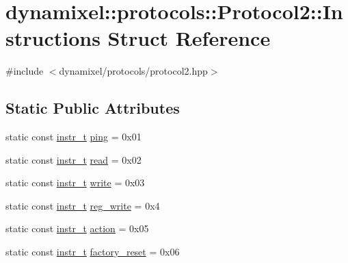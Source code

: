 \hypertarget{structdynamixel_1_1protocols_1_1_protocol2_1_1_instructions}{}\section{dynamixel\+:\+:protocols\+:\+:Protocol2\+:\+:Instructions Struct Reference}
\label{structdynamixel_1_1protocols_1_1_protocol2_1_1_instructions}


{\ttfamily \#include $<$dynamixel/protocols/protocol2.\+hpp$>$}

\subsection*{Static Public Attributes}
\begin{DoxyCompactItemize}
\item 
static const \hyperlink{classdynamixel_1_1protocols_1_1_protocol2_aa7302f20356607bd51e4d4ecf4cb7abf}{instr\+\_\+t} \hyperlink{structdynamixel_1_1protocols_1_1_protocol2_1_1_instructions_ad29aca8a7ac1a0d209c93cf67f1fe0c8}{ping} = 0x01
\item 
static const \hyperlink{classdynamixel_1_1protocols_1_1_protocol2_aa7302f20356607bd51e4d4ecf4cb7abf}{instr\+\_\+t} \hyperlink{structdynamixel_1_1protocols_1_1_protocol2_1_1_instructions_a3d42d5d1d77179010ffc6c02efbffdc7}{read} = 0x02
\item 
static const \hyperlink{classdynamixel_1_1protocols_1_1_protocol2_aa7302f20356607bd51e4d4ecf4cb7abf}{instr\+\_\+t} \hyperlink{structdynamixel_1_1protocols_1_1_protocol2_1_1_instructions_a8962296bdcb1cc06e0a27d0e6a005bf4}{write} = 0x03
\item 
static const \hyperlink{classdynamixel_1_1protocols_1_1_protocol2_aa7302f20356607bd51e4d4ecf4cb7abf}{instr\+\_\+t} \hyperlink{structdynamixel_1_1protocols_1_1_protocol2_1_1_instructions_a1ace80f66ee03cf430a1508f005b3783}{reg\+\_\+write} = 0x4
\item 
static const \hyperlink{classdynamixel_1_1protocols_1_1_protocol2_aa7302f20356607bd51e4d4ecf4cb7abf}{instr\+\_\+t} \hyperlink{structdynamixel_1_1protocols_1_1_protocol2_1_1_instructions_a1f15f30aea4c4e316d5ba15eddcaf49b}{action} = 0x05
\item 
static const \hyperlink{classdynamixel_1_1protocols_1_1_protocol2_aa7302f20356607bd51e4d4ecf4cb7abf}{instr\+\_\+t} \hyperlink{structdynamixel_1_1protocols_1_1_protocol2_1_1_instructions_a354d714d35ea555b78064babdfc8587c}{factory\+\_\+reset} = 0x06

\end{DoxyCompactItemize}
